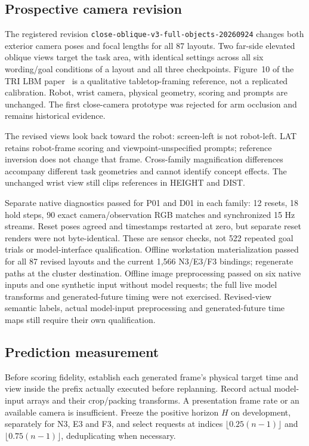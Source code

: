\subsection{Prospective camera revision}
The registered revision \texttt{close-oblique-v3-full-objects-20260924} changes both exterior camera poses and focal lengths for all 87 layouts. Two far-side elevated oblique views target the task area, with identical settings across all six wording/goal conditions of a layout and all three checkpoints. Figure~10 of the TRI LBM paper~\cite{trilbm} is a qualitative tabletop-framing reference, not a replicated calibration. Robot, wrist camera, physical geometry, scoring and prompts are unchanged. The first close-camera prototype was rejected for arm occlusion and remains historical evidence.

The revised views look back toward the robot: screen-left is not robot-left. LAT retains robot-frame scoring and viewpoint-unspecified prompts; reference inversion does not change that frame. Cross-family magnification differences accompany different task geometries and cannot identify concept effects. The unchanged wrist view still clips references in HEIGHT and DIST.

Separate native diagnostics passed for P01 and D01 in each family: 12 resets, 18 hold steps, 90 exact camera/observation RGB matches and synchronized 15 Hz streams. Reset poses agreed and timestamps restarted at zero, but separate reset renders were not byte-identical. These are sensor checks, not 522 repeated goal trials or model-interface qualification. Offline workstation materialization passed for all 87 revised layouts and the current 1,566 N3/E3/F3 bindings; regenerate paths at the cluster destination. Offline image preprocessing passed on six native inputs and one synthetic input without model requests; the full live model transforms and generated-future timing were not exercised. Revised-view semantic labels, actual model-input preprocessing and generated-future time maps still require their own qualification.

\subsection{Prediction measurement}
Before scoring fidelity, establish each generated frame's physical target time and view inside the prefix actually executed before replanning. Record actual model-input arrays and their crop/packing transforms. A presentation frame rate or an available camera is insufficient. Freeze the positive horizon $H$ on development, separately for N3, E3 and F3, and select requests at indices $\lfloor0.25(n-1)\rfloor$ and $\lfloor0.75(n-1)\rfloor$, deduplicating when necessary.

